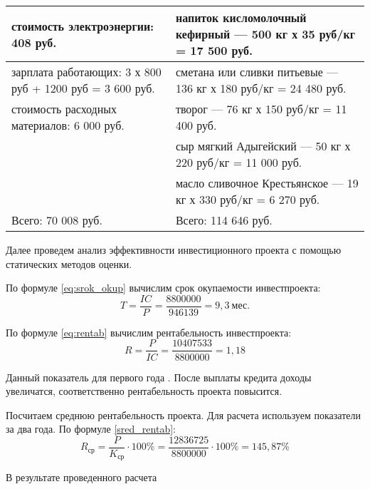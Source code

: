 \begin{table}[]
\begin{tabularx}{\textwidth}{|p{8.05cm}|p{8.05cm}|}
		стоимость электроэнергии: 408 руб.                                      & напиток кисломолочный кефирный — 500 кг х 35 руб/кг = 17 500 руб.   \\ \hline
		зарплата работающих: 3 х 800 руб + 1200 руб = 3 600 руб.                & сметана или сливки питьевые — 136 кг х 180 руб/кг = 24 480 руб.     \\ \hline
		стоимость расходных материалов: 6 000 руб.                              & творог — 76 кг х 150 руб/кг = 11 400 руб.                           \\ \hline
																				& сыр мягкий Адыгейский — 50 кг х 220 руб/кг = 11 000 руб.            \\ \cline{2-2}
																				& масло сливочное Крестьянское — 19 кг х 330 руб/кг = 6 270 руб.      \\ \hline
		Всего:  70 008 руб.                                                     & Всего: 114 646 руб.                                                 \\ \hline
	\end{tabularx}
\end{table}

Далее проведем анализ эффективности инвестиционного проекта с помощью статических методов оценки.



По формуле \eqref{eq:srok_okup} вычислим срок окупаемости инвестпроекта:
\begin{equation*}
T=\dfrac{IC}{P} = \dfrac{8 800 000}{946 139} = 9,3\  \text{мес.}
\end{equation*}

По формуле \eqref{eq:rentab} вычислим рентабельность инвестпроекта:
\begin{equation*}
R = \dfrac{P}{IC} = \dfrac{10407533}{8800000} = 1,18
\end{equation*}

Данный показатель для первого года . После выплаты кредита доходы увеличатся, соответственно рентабельность проекта повысится.

Посчитаем среднюю рентабельность проекта. Для расчета используем показатели за два года. По формуле \eqref{sred_rentab}:
\begin{equation*}
R_{\text{ср}} = \dfrac{P}{K_{\text{ср}}} \cdot 100\% = \dfrac{12836725}{8800000} \cdot 100\% = 145,87\%
\end{equation*}

В результате проведенного расчета



